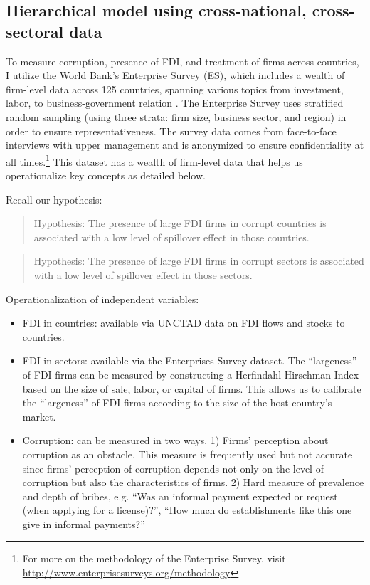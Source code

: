 \subsection{Hierarchical model using cross-national, cross-sectoral data}

To measure corruption, presence of FDI, and treatment of firms across countries, I utilize the World Bank's Enterprise Survey (ES), which includes a wealth of firm-level data across 125 countries, spanning various topics from investment, labor, to business-government relation \citep{WorldBank2015}. The Enterprise Survey uses stratified random sampling (using three strata: firm size, business sector, and region) in order to ensure representativeness. The survey data comes from face-to-face interviews with upper management and is anonymized to ensure confidentiality at all times.\footnote{For more on the methodology of the Enterprise Survey, visit \url{http://www.enterprisesurveys.org/methodology}} This dataset has a wealth of firm-level data that helps us operationalize key concepts as detailed below.

Recall our hypothesis:

\begin{quote}
Hypothesis: The presence of large FDI firms in corrupt countries is associated with a low level of spillover effect in those countries.
\end{quote}

\begin{quote}
Hypothesis: The presence of large FDI firms in corrupt sectors is associated with a low level of spillover effect in those sectors.
\end{quote}

Operationalization of independent variables:
\begin{itemize}
\item FDI in countries: available via UNCTAD data on FDI flows and stocks to countries.

\item FDI in sectors: available via the Enterprises Survey dataset. The ``largeness'' of FDI firms can be measured by constructing a Herfindahl-Hirschman Index based on the size of sale, labor, or capital of firms. This allows us to calibrate the ``largeness'' of FDI firms according to the size of the host country's market.

\item Corruption: can be measured in two ways. 1) Firms' perception about corruption as an obstacle. This measure is frequently used but not accurate since firms' perception of corruption depends not only on the level of corruption but also the characteristics of firms. 2) Hard measure of prevalence and depth of bribes, e.g. ``Was an informal payment expected or request (when applying for a license)?'', ``How much do establishments like this one give in informal payments?'' 
\end{itemize}


